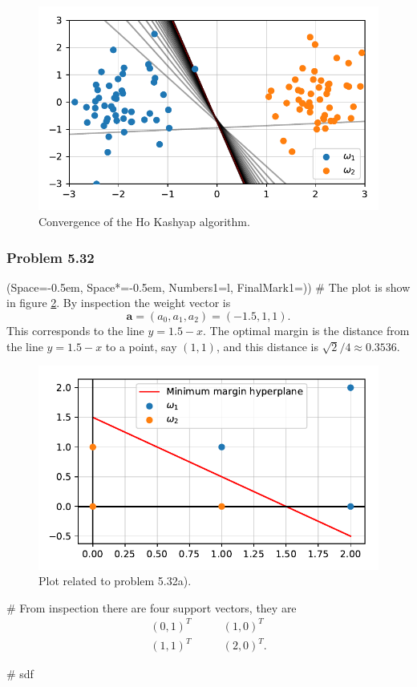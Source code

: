 \documentclass[12pt, a4paper]{article}
\newcommand{\listSpace}{-0.5em}%
\newcommand{\vect}[1]{\bm{#1}}
\begin{document}
\begin{easylist}[enumerate]
\begin{figure}[ht!]
	\centering
	\includegraphics[width=0.5\linewidth]{figs/duda_ch5_prob27_b}
	\caption{Convergence of the Ho Kashyap algorithm.}
	\label{fig:duda_ch5_prob27_b}
\end{figure}

\end{easylist}


\subsubsection*{Problem 5.32}
\begin{easylist}[enumerate]
\ListProperties(Space=\listSpace, Space*=\listSpace, Numbers1=l, FinalMark1={)})
# The plot is show in figure \ref{fig:duda_ch5_prob32}.
By inspection the weight vector is 
\begin{equation*}
	\vect{a} = (a_0, a_1, a_2)= (-1.5, 1, 1).
\end{equation*}
This corresponds to the line $y = 1.5 - x$.
The optimal margin is the distance from the line $y = 1.5 - x$ to a point, say $(1,1)$, and this distance is $\sqrt{2}/4 \approx 0.3536$.

\begin{figure}[ht!]
	\centering
	\includegraphics[width=0.5\linewidth]{figs/duda_ch5_prob32}
	\caption{Plot related to problem 5.32a).}
	\label{fig:duda_ch5_prob32}
\end{figure}

# From inspection there are four support vectors, they are
\begin{align*}
	(0, 1)^T \quad & \quad (1, 0)^T \\
	(1, 1)^T \quad & \quad (2, 0)^T.
\end{align*}

# sdf


\end{easylist}
\end{document}
